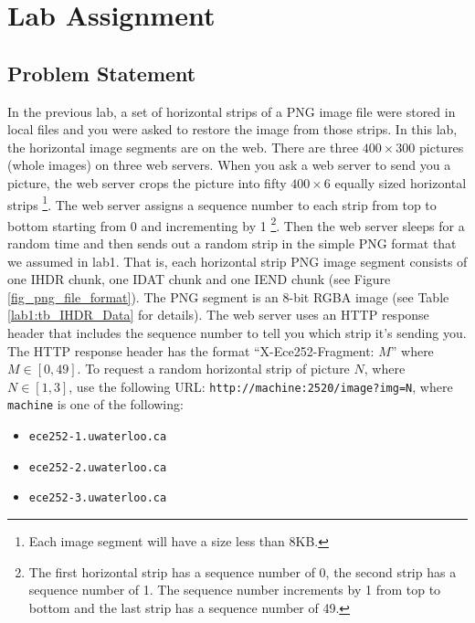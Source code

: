 
\section{Lab Assignment}
\subsection{Problem Statement}
\label{sec:lab2_problem_statement}
In the previous lab, a set of horizontal strips of a PNG image file were stored in local files and you were asked to restore the image from those strips. In this lab, the horizontal image segments are on the web. There are three $400 \times 300$ pictures (whole images) on three web servers. When you ask a web server to send you a picture, the web server crops the picture into fifty
$400 \times 6$ equally sized horizontal strips
\footnote{Each image segment will have a size less than 8KB.}. The web server assigns a sequence number to each strip from top to bottom starting from 0 and incrementing by 1
\footnote{The first horizontal strip has a sequence number of 0, the second strip has a sequence number of 1. The sequence number increments by 1 from top to bottom and the last strip has a sequence number of 49.}. Then the web server sleeps for a random time and then sends out a random strip in the simple PNG format that we assumed in lab1. That is, each horizontal strip PNG image segment consists of one IHDR chunk, one IDAT chunk and one IEND chunk (see Figure \ref{fig_png_file_format}). The PNG segment is an 8-bit RGBA image (see Table \ref{lab1:tb_IHDR_Data} for details). The web server uses an HTTP response header that includes the sequence number to tell you which strip it's sending you. The HTTP response header has the format ``X-Ece252-Fragment: $M$'' where $M \in [0, 49]$. To request a random horizontal strip of picture $N$, where $N\in[1,3]$, use the following URL:
\verb+http://machine:2520/image?img=N+, where \texttt{machine} is one of the following:
\begin{itemize}
\item \texttt{ece252-1.uwaterloo.ca}
\item \texttt{ece252-2.uwaterloo.ca}
\item \texttt{ece252-3.uwaterloo.ca}
\end{itemize}

